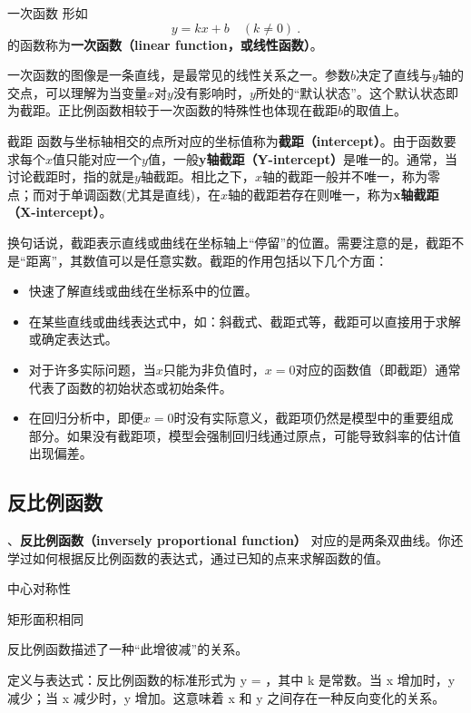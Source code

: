 \begin{definition}{一次函数}
形如
\begin{equation}
y = kx+b\quad(k\neq0)~.
\end{equation}
的函数称为\textbf{一次函数（linear function，或线性函数）}。
\end{definition}

一次函数的图像是一条直线，是最常见的线性关系之一。参数$b$决定了直线与$y$轴的交点，可以理解为当变量$x$对$y$没有影响时，$y$所处的“默认状态”。这个默认状态即为截距。正比例函数相较于一次函数的特殊性也体现在截距$b$的取值上。

\begin{definition}{截距}
函数与坐标轴相交的点所对应的坐标值称为\textbf{截距（intercept）}。由于函数要求每个$x$值只能对应一个$y$值，一般\textbf{y轴截距（Y-intercept）}是唯一的。通常，当讨论截距时，指的就是$y$轴截距。相比之下，$x$轴的截距一般并不唯一，称为零点；而对于单调函数(尤其是直线)，在$x$轴的截距若存在则唯一，称为\textbf{x轴截距（X-intercept）}。
\end{definition}

换句话说，截距表示直线或曲线在坐标轴上“停留”的位置。需要注意的是，截距不是“距离”，其数值可以是任意实数。截距的作用包括以下几个方面：
\begin{itemize}
\item 快速了解直线或曲线在坐标系中的位置。
\item 在某些直线或曲线表达式中，如：斜截式、截距式等，截距可以直接用于求解或确定表达式。
\item 对于许多实际问题，当$x$只能为非负值时，$x=0$对应的函数值（即截距）通常代表了函数的初始状态或初始条件。
\item 在回归分析中，即便$x=0$时没有实际意义，截距项仍然是模型中的重要组成部分。如果没有截距项，模型会强制回归线通过原点，可能导致斜率的估计值出现偏差。
\end{itemize}

\subsection{反比例函数}

、\textbf{反比例函数（inversely proportional function）}
对应的是两条双曲线。你还学过如何根据反比例函数的表达式，通过已知的点来求解函数的值。

中心对称性

矩形面积相同

反比例函数描述了一种“此增彼减”的关系。

定义与表达式：反比例函数的标准形式为  y =  ，其中 k 是常数。当 x 增加时，y 减少；当 x 减少时，y 增加。这意味着 x 和 y 之间存在一种反向变化的关系。

